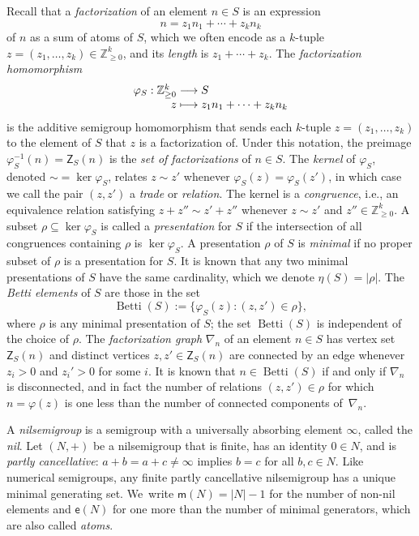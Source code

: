 \documentclass[10pt,a4paper]{amsart}
\newcommand\ZZ{\mathbb{Z}}
\newcommand\til{\mathord\sim}
\DeclareMathOperator\Betti{Betti}
\begin{document}
Recall that a \emph{factorization} of an element $n \in S$ is an expression
$$n = z_1n_1 + \cdots + z_kn_k$$
of $n$ as a sum of atoms of $S$, which we often encode as a $k$-tuple $z = (z_1, \ldots, z_k) \in \ZZ_{\ge 0}^k$, and its \emph{length} is $z_1 + \cdots + z_k$.  
The \emph{factorization homomorphism}
$$\begin{array}{r@{}c@{}l}
\varphi_S:\ZZ_{\ge 0}^k &{}\longrightarrow{}& S \\
z &{}\longmapsto{}& z_1n_1 + \cdots + z_kn_k
\end{array}$$
is the additive semigroup homomorphism that sends each $k$-tuple $z = (z_1, \ldots, z_k)$ to the element of $S$ that $z$ is a factorization of.  Under this notation, the preimage $\varphi_S^{-1}(n) = \mathsf Z_S(n)$ is the \emph{set of factorizations} of $n \in S$.  
The \emph{kernel} of $\varphi_S$, denoted $\til = \ker\varphi_S$, relates $z \sim  z'$ whenever $\varphi_S(z) = \varphi_S(z')$, in which case we call the pair $(z,z')$ a \emph{trade} or \emph{relation}.  
The kernel is a \emph{congruence}, i.e., an equivalence relation satisfying $z + z'' \sim z' + z''$ whenever $z \sim z'$ and $z'' \in \ZZ_{\ge 0}^k$.  
A subset $\rho \subseteq \ker\varphi_S$ is called a \emph{presentation} for $S$ if the intersection of all congruences containing $\rho$ is $\ker\varphi_S$.  A presentation $\rho$ of $S$ is \emph{minimal} if no proper subset of $\rho$ is a presentation for $S$.  It is known that any two minimal presentations of $S$ have the same cardinality, which we denote $\eta(S) = |\rho|$.  
The \emph{Betti elements} of $S$ are those in the set
$$\Betti(S) := \{\varphi_S(z) : (z, z') \in \rho\},$$
where $\rho$ is any minimal presentation of $S$; the set $\Betti(S)$ is independent of the choice of $\rho$.  
The \emph{factorization graph} $\nabla_n$ of an element $n \in S$ has vertex set $\mathsf Z_S(n)$ and distinct vertices $z, z' \in \mathsf Z_S(n)$ are connected by an edge whenever $z_i > 0$ and $z_i' > 0$ for some $i$.  It is known that $n \in \Betti(S)$ if and only if $\nabla_n$ is disconnected, and in fact the number of relations $(z, z') \in \rho$ for which $n = \varphi(z)$ is one less than the number of connected components of~$\nabla_n$.  

A \emph{nilsemigroup} is a semigroup with a universally absorbing element $\infty$, called the \emph{nil}. Let $(N,+)$ be a nilsemigroup that is finite, has an identity $0 \in N$, and is \emph{partly cancellative}: $a + b = a + c \ne \infty$ implies $b = c$ for all $b, c \in N$.
Like numerical semigroups, any finite partly cancellative nilsemigroup has a unique minimal generating set.  We~write $\mathsf m(N) = |N| - 1$ for the number of non-nil elements and $\mathsf e(N)$ for one more than the number of minimal generators, which are also called \emph{atoms}.  
\end{document}
